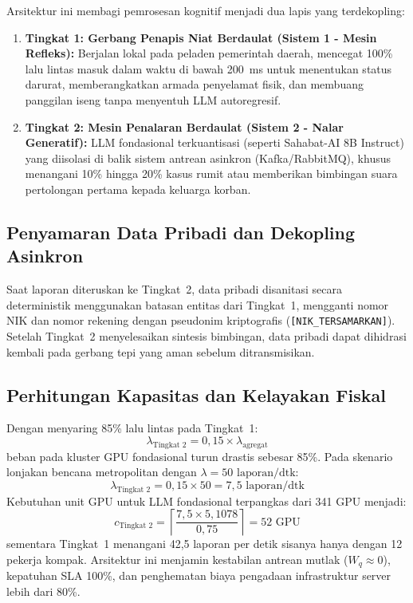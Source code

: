\documentclass[journal,compsoc]{IEEEtran}
\begin{document}
Arsitektur ini membagi pemrosesan kognitif menjadi dua lapis yang terdekopling:
\begin{enumerate}
    \item \textbf{Tingkat 1: Gerbang Penapis Niat Berdaulat (Sistem 1 - Mesin Refleks):} Berjalan lokal pada peladen pemerintah daerah, mencegat 100\% lalu lintas masuk dalam waktu di bawah 200~ms untuk menentukan status darurat, memberangkatkan armada penyelamat fisik, dan membuang panggilan iseng tanpa menyentuh LLM autoregresif.
    \item \textbf{Tingkat 2: Mesin Penalaran Berdaulat (Sistem 2 - Nalar Generatif):} LLM fondasional terkuantisasi (seperti Sahabat-AI 8B Instruct) yang diisolasi di balik sistem antrean asinkron (Kafka/RabbitMQ), khusus menangani 10\% hingga 20\% kasus rumit atau memberikan bimbingan suara pertolongan pertama kepada keluarga korban.
\end{enumerate}

\subsection{Penyamaran Data Pribadi dan Dekopling Asinkron}
Saat laporan diteruskan ke Tingkat~2, data pribadi disanitasi secara deterministik menggunakan batasan entitas dari Tingkat~1, mengganti nomor NIK dan nomor rekening dengan pseudonim kriptografis (\texttt{[NIK\_TERSAMARKAN]}). Setelah Tingkat~2 menyelesaikan sintesis bimbingan, data pribadi dapat dihidrasi kembali pada gerbang tepi yang aman sebelum ditransmisikan.

\subsection{Perhitungan Kapasitas dan Kelayakan Fiskal}
Dengan menyaring 85\% lalu lintas pada Tingkat~1:
\begin{equation}
\lambda_{\text{Tingkat 2}} = 0{,}15 \times \lambda_{\text{agregat}}
\end{equation}
beban pada kluster GPU fondasional turun drastis sebesar 85\%. Pada skenario lonjakan bencana metropolitan dengan $\lambda = 50 \text{ laporan/dtk}$:
\begin{equation}
\lambda_{\text{Tingkat 2}} = 0{,}15 \times 50 = 7{,}5 \text{ laporan/dtk}
\end{equation}
Kebutuhan unit GPU untuk LLM fondasional terpangkas dari 341 GPU menjadi:
\begin{equation}
c_{\text{Tingkat 2}} = \left\lceil \frac{7{,}5 \times 5{,}1078}{0{,}75} \right\rceil = 52 \text{ GPU}
\end{equation}
sementara Tingkat~1 menangani 42,5 laporan per detik sisanya hanya dengan 12 pekerja kompak. Arsitektur ini menjamin kestabilan antrean mutlak ($W_q \approx 0$), kepatuhan SLA 100\%, dan penghematan biaya pengadaan infrastruktur server lebih dari 80\%.
\end{document}
